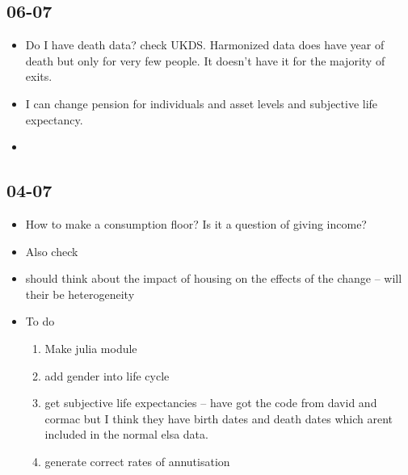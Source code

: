 \documentclass[12pt]{article}
\begin{document}
\subsection{\textbf{06-07}}
\begin{itemize}
      \item Do I have death data? check UKDS.
            Harmonized data does have year of death but only for very few
            people. It doesn't have it for the majority of exits.

      \item I can change pension for individuals and asset levels and subjective life expectancy.
      \item

\end{itemize}


\subsection{\textbf{04-07}}
\begin{itemize}
      \item How to make a consumption floor? Is it a question of giving income?
      \item Also check
      \item should think about the impact of housing on the effects of the change
            -- will their be heterogeneity

      \item To do
            \begin{enumerate}
                  \item Make julia module
                  \item add gender into life cycle
                  \item get subjective life expectancies -- have got the code from
                        david and cormac but I think they have birth dates and death dates which
                        arent included in the normal elsa data.
                  \item generate correct rates of annutisation
            \end{enumerate}
\end{itemize}
\end{document}

